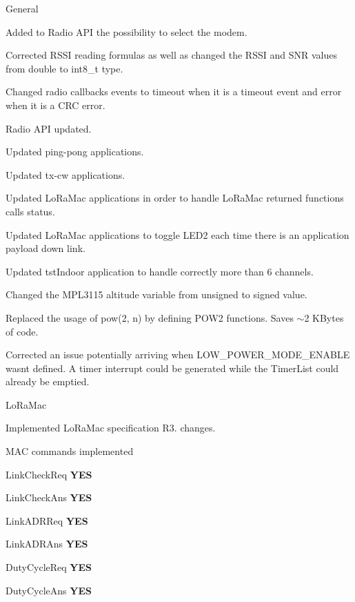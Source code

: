 \begin{DoxyItemize}
\item General
\begin{DoxyEnumerate}
\item Added to Radio A\+PI the possibility to select the modem.
\item Corrected R\+S\+SI reading formulas as well as changed the R\+S\+SI and S\+NR values from double to int8\+\_\+t type.
\item Changed radio callbacks events to timeout when it is a timeout event and error when it is a C\+RC error.
\item Radio A\+PI updated.
\item Updated ping-\/pong applications.
\item Updated tx-\/cw applications.
\item Updated Lo\+Ra\+Mac applications in order to handle Lo\+Ra\+Mac returned functions calls status.
\item Updated Lo\+Ra\+Mac applications to toggle L\+E\+D2 each time there is an application payload down link.
\item Updated tst\+Indoor application to handle correctly more than 6 channels.
\item Changed the M\+P\+L3115 altitude variable from unsigned to signed value.
\item Replaced the usage of pow(2, n) by defining P\+O\+W2 functions. Saves $\sim$2 K\+Bytes of code.
\item Corrected an issue potentially arriving when L\+O\+W\+\_\+\+P\+O\+W\+E\+R\+\_\+\+M\+O\+D\+E\+\_\+\+E\+N\+A\+B\+LE wasn\textquotesingle{}t defined. A timer interrupt could be generated while the Timer\+List could already be emptied.
\end{DoxyEnumerate}
\item Lo\+Ra\+Mac
\begin{DoxyEnumerate}
\item Implemented Lo\+Ra\+Mac specification R3. changes.
\item M\+AC commands implemented
\begin{DoxyItemize}
\item Link\+Check\+Req {\bfseries Y\+ES}
\item Link\+Check\+Ans {\bfseries Y\+ES}
\item Link\+A\+D\+R\+Req {\bfseries Y\+ES}
\item Link\+A\+D\+R\+Ans {\bfseries Y\+ES}
\item Duty\+Cycle\+Req {\bfseries Y\+ES}
\item Duty\+Cycle\+Ans {\bfseries Y\+ES}

\end{DoxyItemize}
\end{DoxyEnumerate}
\end{DoxyItemize}
